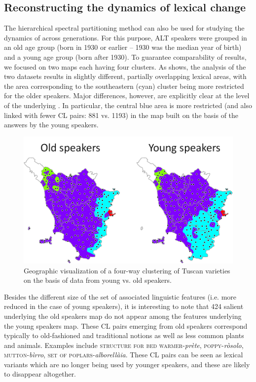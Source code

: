 \documentclass[output=paper]{LSP/langsci}
\begin{document}
\subsection{Reconstructing the dynamics of lexical change}
The hierarchical spectral partitioning method can also be used for studying the dynamics of  across generations. For this purpose, ALT speakers were grouped in an old age group (born in 1930 or earlier – 1930 was the median year of birth) and a young age group (born after 1930). To guarantee comparability of results, we focused on two maps each having four clusters. As  shows, the analysis of the two datasets results in slightly different, partially overlapping lexical areas, with the area corresponding to the southeastern (cyan) cluster being more restricted for the older speakers. Major differences, however, are explicitly clear at the level of the underlying . In particular, the central blue area is more restricted (and also linked with fewer CL pairs: 881 vs. 1193) in the map built on the basis of the answers by the young speakers. 


\begin{figure}[t]
\includegraphics[width=.7\textwidth]{illustrations/monte_wiel_fig4} 
\caption{Geographic visualization of a four-way clustering of Tuscan varieties on the basis of data from young vs. old speakers.}
\label{fig:4}
\end{figure}

Besides the different size of the set of associated linguistic features (i.e. more reduced in the case of young speakers), it is interesting to note that 424 salient  underlying the old speakers map do not appear among the features underlying the young speakers map. These CL pairs emerging from old speakers correspond typically to old-fashioned and traditional notions as well as less common plants and animals. Examples include \textsc{structure for bed warmer}{}-\textit{prète}, \textsc{poppy}{}-\textit{ròsolo}, \textsc{mutton}{}-\textit{bìrro}, \textsc{set of poplars}{}-\textit{alborellàia}. These CL pairs can be seen as lexical variants which are no longer being used by younger speakers, and these are likely to disappear altogether. 
\end{document}
